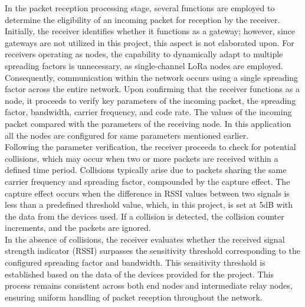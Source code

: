 In the packet reception processing stage, several functions are employed to determine the eligibility of an incoming packet for reception by the receiver. Initially, the receiver identifies whether it functions as a gateway; however, since gateways are not utilized in this project, this aspect is not elaborated upon. For receivers operating as nodes, the capability to dynamically adapt to multiple spreading factors is unnecessary, as single-channel LoRa nodes are employed. Consequently, communication within the network occurs using a single spreading factor across the entire network. Upon confirming that the receiver functions as a node, it proceeds to verify key parameters of the incoming packet, the spreading factor, bandwidth, carrier frequency, and code rate. The values of the incoming packet compared with the parameters of the receiving node. In this application all the nodes are configured for same parameters mentioned earlier.\\
Following the parameter verification, the receiver proceeds to check for potential collisions, which may occur when two or more packets are received within a defined time period. Collisions typically arise due to packets sharing the same carrier frequency and spreading factor, compounded by the capture effect. The capture effect occurs when the difference in RSSI values between two signals is less than a predefined threshold value, which, in this project, is set at 5dB with the data from the devices used. If a collision is detected, the collision counter increments, and the packets are ignored.\\

In the absence of collisions, the receiver evaluates whether the received signal strength indicator (RSSI) surpasses the sensitivity threshold corresponding to the configured spreading factor and bandwidth. This sensitivity threshold is established based on the data of the devices provided for the project. This process remains consistent across both end nodes and intermediate relay nodes, ensuring uniform handling of packet reception throughout the network.\\

